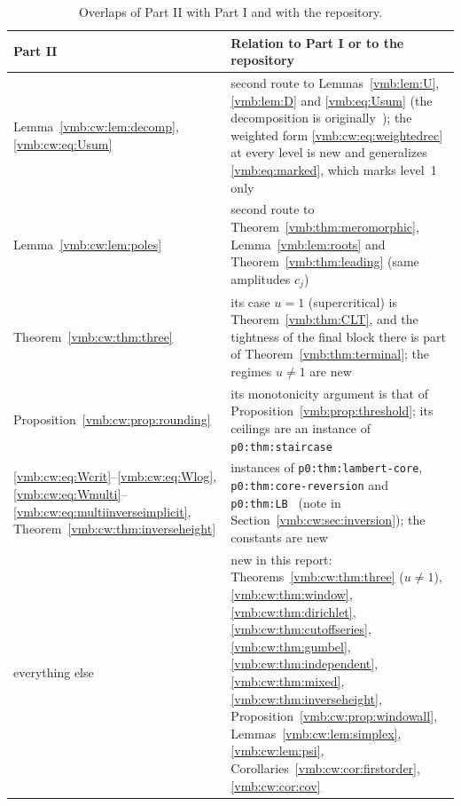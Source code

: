 \documentclass[11pt,a4paper]{article}
\numberwithin{equation}{section}
\theoremstyle{definition}\newtheorem{definition}[theorem]{Definition}
\theoremstyle{remark}\newtheorem{remark}[theorem]{Remark}
\begin{document}
\begin{table}[htbp]
\centering\small
\renewcommand{\arraystretch}{1.12}
\begin{tabular}{@{}>{\raggedright\arraybackslash}p{}>{\raggedright\arraybackslash}p{}@{}}
\toprule
Part II & Relation to Part I or to the repository\\
\midrule
Lemma~\ref{vmb:cw:lem:decomp}, \eqref{vmb:cw:eq:Usum} &
second route to Lemmas~\ref{vmb:lem:U}, \ref{vmb:lem:D} and
\eqref{vmb:eq:Usum} (the decomposition is originally~\cite{FRV}); the
weighted form \eqref{vmb:cw:eq:weightedrec} at every level is new and
generalizes \eqref{vmb:eq:marked}, which marks level~1 only\\
Lemma~\ref{vmb:cw:lem:poles} &
second route to Theorem~\ref{vmb:thm:meromorphic}, Lemma~\ref{vmb:lem:roots}
and Theorem~\ref{vmb:thm:leading} (same amplitudes $c_j$)\\
Theorem~\ref{vmb:cw:thm:three} &
its case $u=1$ (supercritical) is Theorem~\ref{vmb:thm:CLT}, and the
tightness of the final block there is part of
Theorem~\ref{vmb:thm:terminal}; the regimes $u\ne1$ are new\\
Proposition~\ref{vmb:cw:prop:rounding} &
its monotonicity argument is that of Proposition~\ref{vmb:prop:threshold};
its ceilings are an instance of \texttt{p0:thm:staircase}~\cite{vmb-tai}\\
\eqref{vmb:cw:eq:Wcrit}--\eqref{vmb:cw:eq:Wlog},
\eqref{vmb:cw:eq:Wmulti}--\eqref{vmb:cw:eq:multiinverseimplicit},
Theorem~\ref{vmb:cw:thm:inverseheight} &
instances of \texttt{p0:thm:lambert-core}, \texttt{p0:thm:core-reversion}
and \texttt{p0:thm:LB}~\cite{vmb-tai} (note in
Section~\ref{vmb:cw:sec:inversion}); the constants are new\\
everything else &
new in this report: Theorems~\ref{vmb:cw:thm:three} ($u\ne1$),
\ref{vmb:cw:thm:window}, \ref{vmb:cw:thm:dirichlet},
\ref{vmb:cw:thm:cutoffseries}, \ref{vmb:cw:thm:gumbel},
\ref{vmb:cw:thm:independent}, \ref{vmb:cw:thm:mixed},
\ref{vmb:cw:thm:inverseheight}, Proposition~\ref{vmb:cw:prop:windowall},
Lemmas~\ref{vmb:cw:lem:simplex}, \ref{vmb:cw:lem:psi},
Corollaries~\ref{vmb:cw:cor:firstorder}, \ref{vmb:cw:cor:cov}\\
\bottomrule
\end{tabular}
\caption{Overlaps of Part II with Part I and with the repository.}
\label{vmb:cw:tab:routes}
\end{table}
\end{document}
